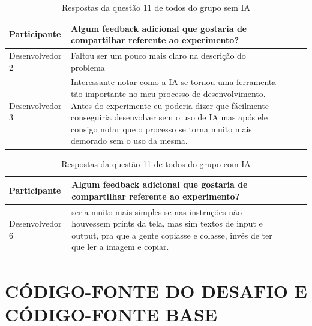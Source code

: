\documentclass[english,brazilian]{UNISINOSartigo} %
\begin{document}
\begin{table}[ht]
    \caption{Respostas da questão 11 de todos do grupo sem IA}
    \label{tab:questao11_sem_ia}
    \centering%
    \footnotesize
    \begin{tabularx}{\textwidth}{lXXXX}
        \toprule
        \textbf{Participante} & \textbf{Algum feedback adicional que gostaria de compartilhar referente ao experimento?} \\
        \midrule
        Desenvolvedor 2 & Faltou ser um pouco mais claro na descrição do problema \\
        \midrule
        Desenvolvedor 3 & Interessante notar como a IA se tornou uma ferramenta tão importante no meu processo de desenvolvimento. Antes do experimente eu poderia dizer que fácilmente conseguiria desenvolver sem o uso de IA mas após ele consigo notar que o processo se torna muito mais demorado sem o uso da mesma. \\
        \bottomrule
    \end{tabularx}
\end{table}
\FloatBarrier

\begin{table}[ht]
    \caption{Respostas da questão 11 de todos do grupo com IA}
    \label{tab:questao11_com_ia}
    \centering%
    \footnotesize
    \begin{tabularx}{\textwidth}{lXXXX}
        \toprule
        \textbf{Participante} & \textbf{Algum feedback adicional que gostaria de compartilhar referente ao experimento?} \\
        \midrule
        Desenvolvedor 6 & seria muito mais simples se nas instruções não houvessem prints da tela, mas sim textos de input e output, pra que a gente copiasse e colasse, invés de ter que ler a imagem e copiar. \\
        \bottomrule
    \end{tabularx}
\end{table}
\FloatBarrier

\section{CÓDIGO-FONTE DO DESAFIO E CÓDIGO-FONTE BASE}

\renewcommand{\thelstlisting}{G.\arabic{lstlisting}}


\end{document}
